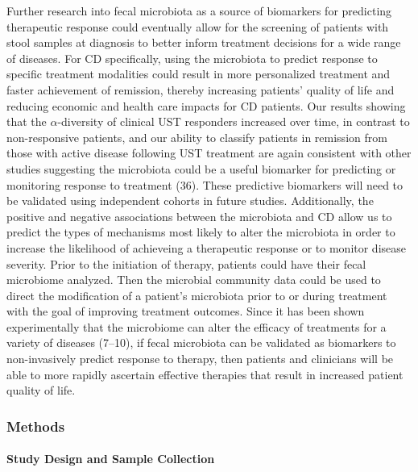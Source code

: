 \documentclass[12pt,]{article}
\let\oldparagraph\paragraph
\renewcommand{\paragraph}[1]{\oldparagraph{#1}\mbox{}}
\begin{document}
Further research into fecal microbiota as a source of biomarkers for
predicting therapeutic response could eventually allow for the screening
of patients with stool samples at diagnosis to better inform treatment
decisions for a wide range of diseases. For CD specifically, using the
microbiota to predict response to specific treatment modalities could
result in more personalized treatment and faster achievement of
remission, thereby increasing patients' quality of life and reducing
economic and health care impacts for CD patients. Our results showing
that the \({\alpha}\)-diversity of clinical UST responders increased
over time, in contrast to non-responsive patients, and our ability to
classify patients in remission from those with active disease following
UST treatment are again consistent with other studies suggesting the
microbiota could be a useful biomarker for predicting or monitoring
response to treatment (36). These predictive biomarkers will need to be
validated using independent cohorts in future studies. Additionally, the
positive and negative associations between the microbiota and CD allow
us to predict the types of mechanisms most likely to alter the
microbiota in order to increase the likelihood of achieveing a
therapeutic response or to monitor disease severity. Prior to the
initiation of therapy, patients could have their fecal microbiome
analyzed. Then the microbial community data could be used to direct the
modification of a patient's microbiota prior to or during treatment with
the goal of improving treatment outcomes. Since it has been shown
experimentally that the microbiome can alter the efficacy of treatments
for a variety of diseases (7--10), if fecal microbiota can be validated
as biomarkers to non-invasively predict response to therapy, then
patients and clinicians will be able to more rapidly ascertain effective
therapies that result in increased patient quality of life.

\newpage

\subsubsection{Methods}\label{methods}

\paragraph{Study Design and Sample
Collection}\label{study-design-and-sample-collection}
\end{document}

